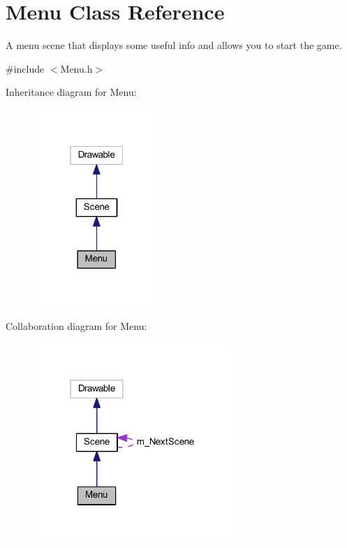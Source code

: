 \hypertarget{class_menu}{}\section{Menu Class Reference}
\label{class_menu}


A menu scene that displays some useful info and allows you to start the game.  




{\ttfamily \#include $<$Menu.\+h$>$}



Inheritance diagram for Menu\+:\nopagebreak
\begin{figure}[H]
\begin{center}
\leavevmode
\includegraphics[width=136pt]{class_menu__inherit__graph}
\end{center}
\end{figure}


Collaboration diagram for Menu\+:\nopagebreak
\begin{figure}[H]
\begin{center}
\leavevmode
\includegraphics[width=213pt]{class_menu__coll__graph}
\end{center}
\end{figure}
